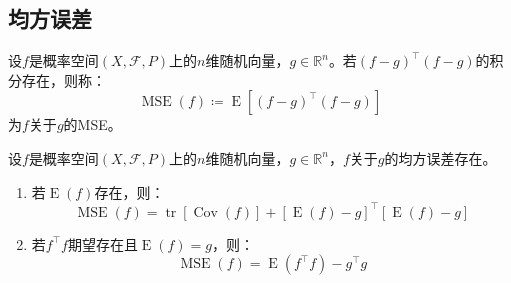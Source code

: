 \subsection{均方误差}
\begin{definition}
	设$f$是概率空间$(X,\mathscr{F},P)$上的$n$维随机向量，$g\in\mathbb{R}^{n}$。若$(f-g)^{\top}(f-g)$的积分存在，则称：
	\begin{equation*}
		\operatorname{MSE}(f)\coloneq\operatorname{E}[(f-g)^{\top}(f-g)]
	\end{equation*}
	为$f$关于$g$的\gls{MSE}。
\end{definition}
\begin{property}\label{prop:MSE}
	设$f$是概率空间$(X,\mathscr{F},P)$上的$n$维随机向量，$g\in\mathbb{R}^{n}$，$f$关于$g$的均方误差存在。
	\begin{enumerate}
		\item 若$\operatorname{E}(f)$存在，则：
		\begin{equation*}
			\operatorname{MSE}(f)=\operatorname{tr}[\operatorname{Cov}(f)]+[\operatorname{E}(f)-g]^{\top}[\operatorname{E}(f)-g]
		\end{equation*}
		\item 若$f^{\top}f$期望存在且$\operatorname{E}(f)=g$，则：
		\begin{equation*}
			\operatorname{MSE}(f)=\operatorname{E}(f^{\top}f)-g^{\top}g
		\end{equation*}
	\end{enumerate}
\end{property}
